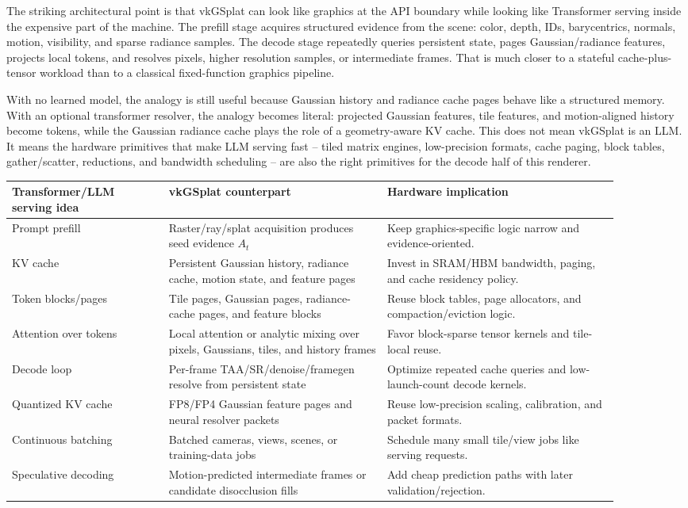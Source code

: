 \documentclass[11pt]{article}
\begin{document}
The striking architectural point is that vkGSplat can look like graphics at the
API boundary while looking like Transformer serving inside the expensive part of
the machine. The prefill stage acquires structured evidence from the scene:
color, depth, IDs, barycentrics, normals, motion, visibility, and sparse
radiance samples. The decode stage repeatedly queries persistent state, pages
Gaussian/radiance features, projects local tokens, and resolves pixels, higher
resolution samples, or intermediate frames. That is much closer to a
stateful cache-plus-tensor workload than to a classical fixed-function graphics
pipeline.

With no learned model, the analogy is still useful because Gaussian history and
radiance cache pages behave like a structured memory. With an optional
transformer resolver, the analogy becomes literal: projected Gaussian features,
tile features, and motion-aligned history become tokens, while the Gaussian
radiance cache plays the role of a geometry-aware KV cache. This does not mean
vkGSplat is an LLM. It means the hardware primitives that make LLM serving fast
-- tiled matrix engines, low-precision formats, cache paging, block tables,
gather/scatter, reductions, and bandwidth scheduling -- are also the right
primitives for the decode half of this renderer.

\begin{center}
\small
\begin{tabular}{p{0.23\linewidth}p{0.32\linewidth}p{0.34\linewidth}}
\toprule
Transformer/LLM serving idea & vkGSplat counterpart & Hardware implication \\
\midrule
Prompt prefill & Raster/ray/splat acquisition produces seed evidence $A_t$ & Keep graphics-specific logic narrow and evidence-oriented. \\
KV cache & Persistent Gaussian history, radiance cache, motion state, and feature pages & Invest in SRAM/HBM bandwidth, paging, and cache residency policy. \\
Token blocks/pages & Tile pages, Gaussian pages, radiance-cache pages, and feature blocks & Reuse block tables, page allocators, and compaction/eviction logic. \\
Attention over tokens & Local attention or analytic mixing over pixels, Gaussians, tiles, and history frames & Favor block-sparse tensor kernels and tile-local reuse. \\
Decode loop & Per-frame TAA/SR/denoise/framegen resolve from persistent state & Optimize repeated cache queries and low-launch-count decode kernels. \\
Quantized KV cache & FP8/FP4 Gaussian feature pages and neural resolver packets & Reuse low-precision scaling, calibration, and packet formats. \\
Continuous batching & Batched cameras, views, scenes, or training-data jobs & Schedule many small tile/view jobs like serving requests. \\
Speculative decoding & Motion-predicted intermediate frames or candidate disocclusion fills & Add cheap prediction paths with later validation/rejection. \\
\bottomrule
\end{tabular}
\end{center}
\end{document}
